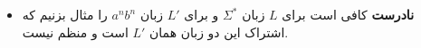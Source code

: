 \documentclass[../HW.tex]{subfiles}
\begin{document}
\begin{itemize}



            \item[\textbf{(c}] \textbf{نادرست}
                  کافی است برای $L$ زبان $\Sigma^*$ و برای $L'$ زبان $a^nb^n$ را مثال بزنیم که اشتراک این دو زبان همان $L'$ است و منظم نیست.


      \end{itemize}

\fi
\end{document}
